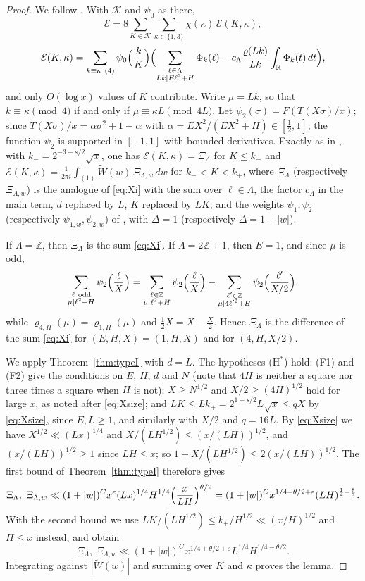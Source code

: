 \documentclass[11pt]{amsart}
\theoremstyle{remark}
\theoremstyle{definition}
\numberwithin{equation}{section}
\newcommand{\Z}{\mathbb{Z}}
\newcommand{\R}{\mathbb{R}}
\newcommand{\eps}{\varepsilon}
\newcommand{\Ec}{\mathcal{E}}
\begin{document}
\begin{proof}
We follow \cite[Lemma~7.3]{IC}. With $\mathcal K$ and $\psi_0$ as there,
\[
\Ec=8\sum_{K\in\mathcal K}\sum_{\kappa\in\{1,3\}}\chi(\kappa)\,\Ec(K,\kappa),
\]
\[
\Ec(K,\kappa)=\sum_{k\equiv\kappa\ (4)}\psi_0\Bigl(\frac kK\Bigr)\Bigl(\sum_{\substack{\ell\in\Lambda\\ Lk\mid E\ell^2+H}}\Phi_k(\ell)-c_\Lambda\frac{\varrho(Lk)}{Lk}\int_\R\Phi_k(t)\,dt\Bigr),
\]
and only $O(\log x)$ values of $K$ contribute. Write $\mu=Lk$, so that $k\equiv\kappa\pmod4$ if and only if $\mu\equiv\kappa L\pmod{4L}$. Let $\psi_2(\sigma)=F(T(X\sigma)/x)$; since $T(X\sigma)/x=\alpha\sigma^2+1-\alpha$ with $\alpha=EX^2/(EX^2+H)\in[\frac12,1]$, the function $\psi_2$ is supported in $[-1,1]$ with bounded derivatives. Exactly as in \cite[Lemma~7.3]{IC}, with $k_-=2^{-3-s/2}\sqrt x$, one has $\Ec(K,\kappa)=\Xi_\Lambda$ for $K\le k_-$ and $\Ec(K,\kappa)=\frac1{2\pi i}\int_{(1)}\widetilde W(w)\,\Xi_{\Lambda,w}\,dw$ for $k_-<K<k_+$, where $\Xi_\Lambda$ (respectively $\Xi_{\Lambda,w}$) is the analogue of \eqref{eq:Xi} with the sum over $\ell\in\Lambda$, the factor $c_\Lambda$ in the main term, $d$ replaced by $L$, $K$ replaced by $LK$, and the weights $\psi_1,\psi_2$ (respectively $\psi_{1,w},\psi_{2,w}$) of \cite[Lemma~7.3]{IC}, with $\Delta=1$ (respectively $\Delta=1+|w|$).

If $\Lambda=\Z$, then $\Xi_\Lambda$ is the sum \eqref{eq:Xi}. If $\Lambda=2\Z+1$, then $E=1$, and since $\mu$ is odd,
\[
\sum_{\substack{\ell\ \mathrm{odd}\\ \mu\mid\ell^2+H}}\psi_2\Bigl(\frac\ell X\Bigr)=\sum_{\substack{\ell\in\Z\\ \mu\mid\ell^2+H}}\psi_2\Bigl(\frac\ell X\Bigr)-\sum_{\substack{\ell'\in\Z\\ \mu\mid4\ell'^2+H}}\psi_2\Bigl(\frac{\ell'}{X/2}\Bigr),
\]
while $\varrho_{4,H}(\mu)=\varrho_{1,H}(\mu)$ and $\frac12X=X-\frac X2$. Hence $\Xi_\Lambda$ is the difference of the sum \eqref{eq:Xi} for $(E,H,X)=(1,H,X)$ and for $(4,H,X/2)$.

We apply Theorem~\ref{thm:typeI} with $d=L$. The hypotheses \textup{(H$^*$)} hold: (F1) and (F2) give the conditions on $E$, $H$, $d$ and $N$ (note that $4H$ is neither a square nor three times a square when $H$ is not); $X\ge N^{1/2}$ and $X/2\ge(4H)^{1/2}$ hold for large $x$, as noted after \eqref{eq:Xsize}; and $LK\le Lk_+=2^{1-s/2}L\sqrt x\le qX$ by \eqref{eq:Xsize}, since $E,L\ge1$, and similarly with $X/2$ and $q=16L$. By \eqref{eq:Xsize} we have $X^{1/2}\ll(Lx)^{1/4}$ and $X/(LH^{1/2})\le(x/(LH))^{1/2}$, and $(x/(LH))^{1/2}\ge1$ since $LH\le x$; so $1+X/(LH^{1/2})\le2(x/(LH))^{1/2}$. The first bound of Theorem~\ref{thm:typeI} therefore gives
\[
\Xi_\Lambda,\ \Xi_{\Lambda,w}\ll(1+|w|)^Cx^{\eps}(Lx)^{1/4}H^{1/4}\Bigl(\frac x{LH}\Bigr)^{\theta/2}=(1+|w|)^Cx^{1/4+\theta/2+\eps}(LH)^{\frac14-\frac\theta2}.
\]
With the second bound we use $LK/(LH^{1/2})\le k_+/H^{1/2}\ll(x/H)^{1/2}$ and $H\le x$ instead, and obtain
\[
\Xi_\Lambda,\ \Xi_{\Lambda,w}\ll(1+|w|)^Cx^{1/4+\theta/2+\eps}L^{1/4}H^{1/4-\theta/2}.
\]
Integrating against $|\widetilde W(w)|$ and summing over $K$ and $\kappa$ proves the lemma.
\end{proof}
\end{document}
